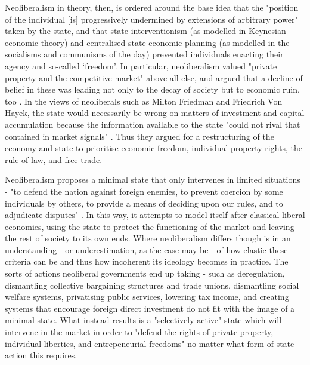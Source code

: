Neoliberalism in theory, then, is ordered around the base idea that the "position of the individual [is] progressively undermined by extensions of arbitrary power" \citep[p. 20]{harvey_brief_2007} taken by the state, and that state interventionism (as modelled in Keynesian economic theory) and centralised state economic planning (as modelled in the socialisms and communisms of the day) prevented individuals enacting their agency and so-called `freedom'. In particular, neoliberalism valued "private property and the competitive market" above all else, and argued that a decline of belief in these was leading not only to the decay of society but to economic ruin, too \citep{mont_pelerin_society_about_2005}. In the views of neoliberals such as Milton Friedman and Friedrich Von Hayek, the state would necessarily be wrong on matters of investment and capital accumulation because the information available to the state "could not rival that contained in market signals" \citep[p. 49]{harvey_brief_2007}. Thus they argued for a restructuring of the economy and state to prioritise economic freedom, individual property rights, the rule of law, and free trade.

Neoliberalism proposes a minimal state that only intervenes in limited situations - "to defend the nation against foreign enemies, to prevent coercion by some individuals by others, to provide a means of deciding upon our rules, and to adjudicate disputes" \citep[p. 53]{connolly_fragility_2013}. In this way, it attempts to model itself after classical liberal economies, using the state to protect the functioning of the market and leaving the rest of society to its own ends. Where neoliberalism differs though is in an understanding - or underestimation, as the case may be - of how elastic these criteria can be and thus how incoherent its ideology becomes in practice. The sorts of actions neoliberal governments end up taking - such as deregulation, dismantling collective bargaining structures and trade unions, dismantling social welfare systems, privatising public services, lowering tax income, and creating systems that encourage foreign direct
investment \citep[p. 52]{harvey_brief_2007} do not fit with the image of a minimal state. What instead results is a "selectively active" state \citep[p. 21]{connolly_fragility_2013} which will intervene in the market in order to "defend the rights of private property, individual liberties, and entrepeneurial freedoms" \citep[p. 49]{harvey_brief_2007} no matter what form of state action this requires.

